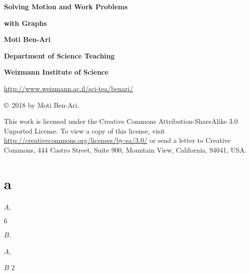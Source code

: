 \documentclass[11pt,a4paper]{article}
\begin{document}
\thispagestyle{empty}

\begin{center}

\textbf{\huge Solving Motion and Work Problems}

\smallskip

\textbf{\huge with Graphs}


\bigskip
\bigskip
\bigskip

\textbf{\LARGE Moti Ben-Ari}

\bigskip

\textbf{\Large Department of Science Teaching}

\bigskip

\textbf{\Large Weizmann Institute of Science}

\bigskip

\url{http://www.weizmann.ac.il/sci-tea/benari/}

\end{center}

\bigskip
\bigskip

\begin{center}
\copyright{}\  2018 by Moti Ben-Ari.
\end{center}

This work is licensed under the Creative Commons Attribution-ShareAlike 3.0 Unported License. To view a copy of this license, visit \url{http://creativecommons.org/licenses/by-sa/3.0/} or send a letter to Creative Commons, 444 Castro Street, Suite 900, Mountain View, California, 94041, USA.

\bigskip
%

\newpage





\newpage

\section*{a}

$A$,

$6$

$B$.

$A$,

$B$
$2$
\end{document}
